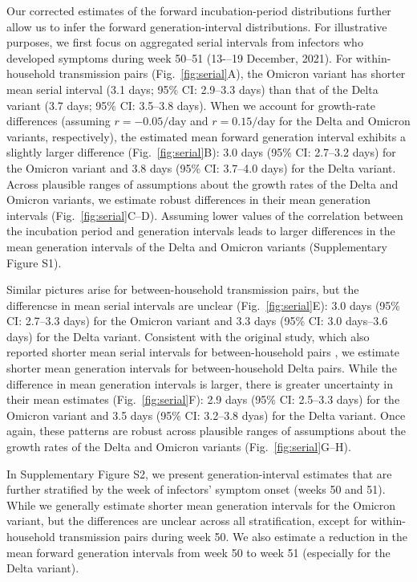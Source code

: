 \documentclass[12pt]{article}
\newcommand{\fref}[1]{Fig.~\ref{fig:#1}}
\begin{document}
Our corrected estimates of the forward incubation-period distributions further allow us to infer the forward generation-interval distributions.
For illustrative purposes, we first focus on aggregated serial intervals from infectors who developed symptoms during week 50--51 (13-–19 December, 2021).
For within-household transmission pairs (\fref{serial}A), the Omicron variant has shorter mean serial interval (3.1 days; 95\% CI: 2.9--3.3 days) than that of the Delta variant (3.7 days; 95\% CI: 3.5--3.8 days).
When we account for growth-rate differences (assuming $r=-0.05/\mathrm{day}$ and $r=0.15/\mathrm{day}$ for the Delta and Omicron variants, respectively), the estimated mean forward generation interval exhibits a slightly larger difference (\fref{serial}B):
3.0 days (95\% CI: 2.7--3.2 days) for the Omicron variant and 3.8 days (95\% CI: 3.7--4.0 days) for the Delta variant.
Across plausible ranges of assumptions about the growth rates of the Delta and Omicron variants, we estimate robust differences in their mean generation intervals (\fref{serial}C--D).
Assuming lower values of the correlation between the incubation period and generation intervals leads to larger differences in the mean generation intervals of the Delta and Omicron variants (Supplementary Figure S1).

Similar pictures arise for between-household transmission pairs, but the differencse in mean serial intervals are unclear (\fref{serial}E): 3.0 days (95\% CI: 2.7--3.3 days) for the Omicron variant and 3.3 days (95\% CI: 3.0 days--3.6 days) for the Delta variant.
Consistent with the original study, which also reported shorter mean serial intervals for between-household pairs \citep{backer2021omicron}, we estimate shorter mean generation intervals for between-household Delta pairs.
While the difference in mean generation intervals is larger, there is greater uncertainty in their mean estimates (\fref{serial}F): 2.9 days (95\% CI: 2.5--3.3 days) for the Omicron variant and 3.5 days (95\% CI: 3.2--3.8 dyas) for the Delta variant.
Once again, these patterns are robust across plausible ranges of assumptions about the growth rates of the Delta and Omicron variants (\fref{serial}G--H).

In Supplementary Figure S2, we present generation-interval estimates that are further stratified by the week of infectors' symptom onset (weeks 50 and 51).
While we generally estimate shorter mean generation intervals for the Omicron variant, but the differences are unclear across all stratification, except for within-household transmission pairs during week 50.
We also estimate a reduction in the mean forward generation intervals from week 50 to week 51 (especially for the Delta variant). 
\end{document}
